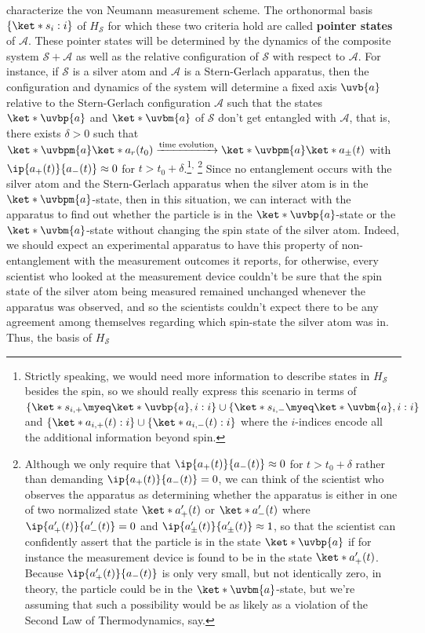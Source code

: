 \documentclass[12pt]{report}
\providecommand{\DIFadd}[1]{{\protect\color{blue}\uwave{#1}}} %
\providecommand{\DIFaddbegin}{} %
\providecommand{\DIFaddend}{} %
\begin{document}
    characterize the von Neumann measurement scheme. The orthonormal basis $\{\ket*{s_i}:i\}$ of $H_\mathcal{S}$ for which these two criteria hold are called \textbf{pointer states\label{pointer}} of $\mathcal{A}$.   %
%
    These pointer states will be determined by the  dynamics of the composite system $\mathcal{S}+\mathcal{A}$ as well as the relative configuration of $\mathcal{S}$ with respect to $\mathcal{A}$. For instance, if $\mathcal{S}$ is a silver atom and $\mathcal{A}$ is a Stern-Gerlach apparatus, then the configuration and dynamics of the system will determine a fixed axis $\uvb{a}$ relative to the Stern-Gerlach configuration $\mathcal{A}$ such that the states $\ket*{\uvbp{a}}$ and $\ket*{\uvbm{a}}$ of $\mathcal{S}$ don't get entangled with $\mathcal{A}$, that is, there exists $\delta>0$ such that $\ket*{\uvbpm{a}}\ket*{a_r(t_0)}\xrightarrow{\text{time evolution}}\ket*{\uvbpm{a}}\ket*{a_\pm(t)}$ with $\ip{a_+(t)}{a_-(t)}\approx 0$ for $t> t_0+\delta$.\footnote{%
    Strictly speaking, we would  need more information to describe states in $H_\mathcal{S}$ besides the spin, so we should really express this scenario in terms of $\{\ket*{s_{i,+}}\myeq \ket*{\uvbp{a},i}:i\}\cup \{\ket*{s_{i,-}}\myeq \ket*{\uvbm{a},i}:i\}$ and  $\{\ket*{a_{i,+}(t)}:i\}\cup\{\ket*{a_{i,-}(t)}:i\}$ where the $i$-indices encode all the additional information beyond spin.
    }\textsuperscript{, }\footnote{\label{nearzero}Although 
    we only require that  $\ip{a_+(t)}{a_-(t)}\approx 0$ for $t> t_0+\delta$ rather than demanding $\ip{a_+(t)}{a_-(t)} = 0$, we can think of the scientist who observes the apparatus as determining whether the apparatus is either in one of two normalized state $\ket*{a_+'(t)}$ or $\ket*{a_-'(t)}$ where 
    $\ip{a_+'(t)}{a_-'(t)} = 0$ 
    and $\ip{a_\pm'(t)}{a_\pm'(t)}\approx 1$, so that the scientist can confidently assert that the particle is in the state $\ket*{\uvbp{a}}$ if for instance the measurement device is found to be in the state $\ket*{a_+'(t)}$. Because $\ip{a_+'(t)}{a_-(t)}$ is only very small, but not identically zero, in theory, the particle could be in the $\ket*{\uvbm{a}}$-state, but we're assuming that such a possibility would be as likely as a \DIFaddbegin \DIFadd{significant }\DIFaddend violation of the Second Law of Thermodynamics, say.}
    Since no entanglement occurs with the silver atom and the Stern-Gerlach apparatus when the silver atom is in the $\ket*{\uvbpm{a}}$-state, then in this situation, we can interact with the apparatus to find out whether the particle is in the $\ket*{\uvbp{a}}$-state or the $\ket*{\uvbm{a}}$-state without changing the spin state of the silver atom. Indeed, we should expect an experimental apparatus to have this property of non-entanglement with the measurement outcomes it reports, for otherwise, every scientist who looked at the measurement device couldn't be sure that the spin state of the silver atom being measured remained unchanged whenever the apparatus was observed, and so the scientists couldn't expect there to be any agreement among themselves  regarding which spin-state the silver atom was in. Thus, the basis of $H_\mathcal{S}$ 
\end{document}
